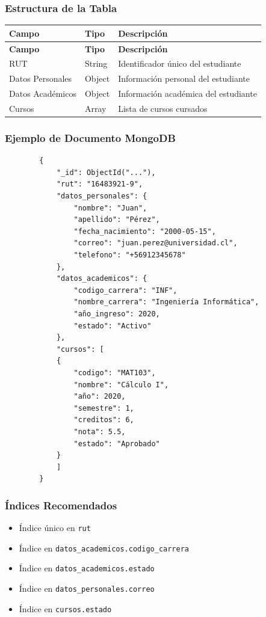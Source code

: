 \documentclass[12pt,a4paper]{article}
\begin{document}
	\subsubsection{Estructura de la Tabla}
	
	\begin{longtable}{|p{3cm}|p{3cm}|p{8cm}|}
		\hline
		\textbf{Campo} & \textbf{Tipo} & \textbf{Descripción} \\
		\hline
		\endfirsthead
		
		\hline
		\textbf{Campo} & \textbf{Tipo} & \textbf{Descripción} \\
		\hline
		\endhead
		
		\hline
		\endfoot
		
		RUT & String & Identificador único del estudiante \\
		\hline
		Datos Personales & Object & Información personal del estudiante \\
		\hline
		Datos Académicos & Object & Información académica del estudiante \\
		\hline
		Cursos & Array & Lista de cursos cursados \\
		\hline
	\end{longtable}
	
	\subsubsection{Ejemplo de Documento MongoDB}
	
	\begin{verbatim}
		{
			"_id": ObjectId("..."),
			"rut": "16483921-9",
			"datos_personales": {
				"nombre": "Juan",
				"apellido": "Pérez",
				"fecha_nacimiento": "2000-05-15",
				"correo": "juan.perez@universidad.cl",
				"telefono": "+56912345678"
			},
			"datos_academicos": {
				"codigo_carrera": "INF",
				"nombre_carrera": "Ingeniería Informática",
				"año_ingreso": 2020,
				"estado": "Activo"
			},
			"cursos": [
			{
				"codigo": "MAT103",
				"nombre": "Cálculo I",
				"año": 2020,
				"semestre": 1,
				"creditos": 6,
				"nota": 5.5,
				"estado": "Aprobado"
			}
			]
		}
	\end{verbatim}
	
	\subsubsection{Índices Recomendados}
	
	\begin{itemize}
		\item Índice único en \texttt{rut}
		\item Índice en \texttt{datos\_academicos.codigo\_carrera}
		\item Índice en \texttt{datos\_academicos.estado}
		\item Índice en \texttt{datos\_personales.correo}
		\item Índice en \texttt{cursos.estado}
	\end{itemize}
	
\end{document}
